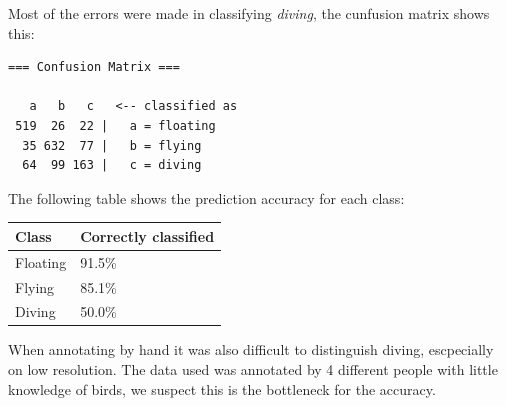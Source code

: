 Most of the errors were made in classifying \emph{diving}, the cunfusion matrix shows this:
\begin{verbatim}
=== Confusion Matrix ===

   a   b   c   <-- classified as
 519  26  22 |   a = floating
  35 632  77 |   b = flying
  64  99 163 |   c = diving
\end{verbatim}
The following table shows the prediction accuracy for each class:
\begin{center}
\begin{tabular}{l|l}
	\textnormal{Class} & \textnormal{Correctly classified} \\ \hline 
	Floating & 91.5\% \\
	Flying &  85.1\% \\
	Diving & 50.0\% \\
\end{tabular}
\end{center}

When annotating by hand it was also difficult to distinguish diving, escpecially on low resolution. The data used was annotated by 4 different people with little knowledge of birds, we suspect this is the bottleneck for the accuracy. 